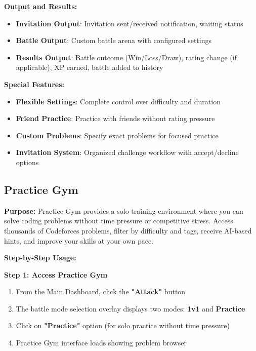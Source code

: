 \documentclass[12pt,a4paper]{article}
\begin{document}
\textbf{Output and Results:}
\begin{itemize}[leftmargin=1.8em]
\item \textbf{Invitation Output}: Invitation sent/received notification, waiting status
\item \textbf{Battle Output}: Custom battle arena with configured settings
\item \textbf{Results Output}: Battle outcome (Win/Loss/Draw), rating change (if applicable), XP earned, battle added to history
\end{itemize}

\textbf{Special Features:}
\begin{itemize}[leftmargin=1.8em]
\item \textbf{Flexible Settings}: Complete control over difficulty and duration
\item \textbf{Friend Practice}: Practice with friends without rating pressure
\item \textbf{Custom Problems}: Specify exact problems for focused practice
\item \textbf{Invitation System}: Organized challenge workflow with accept/decline options
\end{itemize}

\FloatBarrier

\subsection{Practice Gym}

\textbf{Purpose:} Practice Gym provides a solo training environment where you can solve coding problems without time pressure or competitive stress. Access thousands of Codeforces problems, filter by difficulty and tags, receive AI-based hints, and improve your skills at your own pace.

\textbf{Step-by-Step Usage:}

\textbf{Step 1: Access Practice Gym}
\begin{enumerate}
\item From the Main Dashboard, click the \textbf{"Attack"} button
\item The battle mode selection overlay displays two modes: \textbf{1v1} and \textbf{Practice}
\item Click on \textbf{"Practice"} option (for solo practice without time pressure)
\item Practice Gym interface loads showing problem browser
\end{enumerate}
\end{document}
